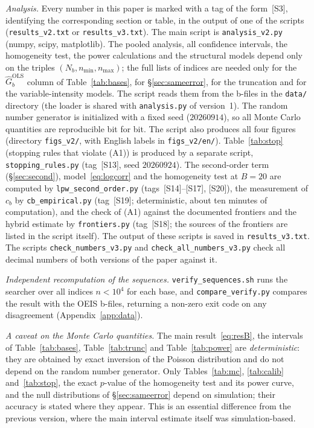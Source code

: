 \documentclass[11pt,a4paper]{article}
\theoremstyle{plain}
\theoremstyle{remark}
\begin{document}
\emph{Analysis.} Every number in this paper is marked with a tag of the
form~[S3], identifying the corresponding section or table, in the output of one
of the scripts (\texttt{results\_v2.txt} or \texttt{results\_v3.txt}). The main
script is \texttt{analysis\_v2.py} (numpy, scipy, matplotlib). The pooled
analysis, all confidence intervals, the homogeneity test, the power
calculations and the structural models depend only on the triples
$(N_b,n_{\min},n_{\max})$; the full lists of indices are needed only for the
$\hat G^{\mathrm{OLS}}_b$ column of Table~\ref{tab:bases}, for
\S\ref{sec:sameerror}, for the truncation and for the variable-intensity models.
The script reads them from the b-files in the \texttt{data/} directory (the
loader is shared with \texttt{analysis.py} of version~1). The random number
generator is initialized with a fixed seed ($20260914$), so all Monte Carlo
quantities are reproducible bit for bit. The script also produces all four
figures (directory \texttt{figs\_v2/}, with English labels in
\texttt{figs\_v2/en/}).
Table~\ref{tab:stop} (stopping rules that violate (A1)) is produced by a separate
script, \texttt{stopping\_rules.py} (tag~[S13], seed $20260924$). The
second-order term (\S\ref{sec:second}), model~\eqref{eq:logcorr} and the
homogeneity test at $B=20$ are computed by \texttt{lpw\_second\_order.py}
(tags~[S14]--[S17], [S20]), the measurement of $c_b$ by
\texttt{cb\_empirical.py} (tag~[S19]; deterministic, about ten minutes of
computation), and the check of (A1) against the documented frontiers and the
hybrid estimate by \texttt{frontiers.py} (tag~[S18]; the sources of the
frontiers are listed in the script itself). The output of these scripts is saved
in \texttt{results\_v3.txt}. The scripts \texttt{check\_numbers\_v3.py} and
\texttt{check\_all\_numbers\_v3.py} check all decimal numbers of both versions of
the paper against it.

\emph{Independent recomputation of the sequences.}
\texttt{verify\_sequences.sh} runs the searcher over all indices $n<10^4$ for
each base, and \texttt{compare\_verify.py} compares the result with the OEIS
b-files, returning a non-zero exit code on any disagreement
(Appendix~\ref{app:data}).

\emph{A caveat on the Monte Carlo quantities.} The main result~\eqref{eq:resB},
the intervals of Table~\ref{tab:bases}, Table~\ref{tab:trunc} and
Table~\ref{tab:power} are \emph{deterministic}: they are obtained by exact
inversion of the Poisson distribution and do not depend on the random number
generator. Only Tables~\ref{tab:mc}, \ref{tab:calib} and~\ref{tab:stop}, the
exact $p$-value of the homogeneity test and its power curve, and the null
distributions of \S\ref{sec:sameerror} depend on simulation; their accuracy is
stated where they appear. This is an essential difference from the previous
version, where the main interval estimate itself was simulation-based.
\end{document}
